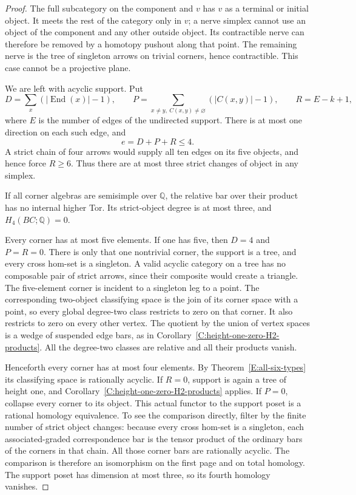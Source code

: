 \begin{proof}
The full subcategory on the component and $v$ has $v$ as a
terminal or initial object.  It meets the rest of the
category only in $v$; a nerve simplex cannot use an object
of the component and any other outside object.  Its
contractible nerve can therefore be removed by a homotopy
pushout along that point.  The remaining nerve is the tree
of singleton arrows on trivial corners, hence contractible.
This case cannot be a projective plane.

We are left with acyclic support.  Put
\[
 D=\sum_x(|\operatorname{End}(x)|-1),\qquad
 P=\sum_{x\ne y,\ C(x,y)\ne\varnothing}(|C(x,y)|-1),
 \qquad R=E-k+1,
\]
where $E$ is the number of edges of the undirected support.
There is at most one direction on each such edge, and
\begin{equation}\label{C:excess-decomposition}
 e=D+P+R\leq4.
\end{equation}
A strict chain of four arrows would supply all ten edges
on its five objects, and hence force $R\geq6$.
Thus there are at most three strict changes of object in
any simplex.

If all corner algebras are semisimple over $\mathbb Q$,
the relative bar over their product has no internal higher
Tor.  Its strict-object degree is at most three, and
$H_4(BC;\mathbb Q)=0$.

Every corner has at most five elements.  If one has five,
then $D=4$ and $P=R=0$.  There is only that one nontrivial
corner, the support is a tree, and every cross hom-set is
a singleton.  A valid acyclic category on a tree has no
composable pair of strict arrows, since their composite
would create a triangle.  The five-element corner is
incident to a singleton leg to a point.  The corresponding
two-object classifying space is the join of its corner
space with a point, so every global degree-two class
restricts to zero on that corner.  It also restricts to
zero on every other vertex.  The quotient by the union
of vertex spaces is a wedge of suspended edge bars, as
in Corollary~\ref{C:height-one-zero-H2-products}.
All the degree-two classes are relative and all their
products vanish.

Henceforth every corner has at most four elements.  By
Theorem~\ref{E:all-six-types} its classifying space is
rationally acyclic.  If $R=0$, support is again a tree of
height one, and Corollary~\ref{C:height-one-zero-H2-products}
applies.  If $P=0$, collapse every corner to its object.
This actual functor to the support poset is a rational
homology equivalence.  To see the comparison directly,
filter by the finite number of strict object changes:
because every cross hom-set is a singleton, each
associated-graded correspondence bar is the tensor
product of the ordinary bars of the corners in that
chain.  All those corner bars are rationally acyclic.
The comparison is therefore an isomorphism on the first
page and on total homology.  The support poset has
dimension at most three, so its fourth homology vanishes.


\end{proof}
